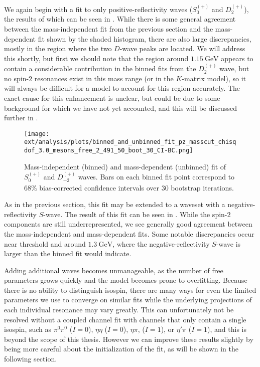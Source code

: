We again begin with a fit to only positive-reflectivity waves ($S_0^{(+)}$ and $D_2^{(+)}$), the results of which can be seen in . While there is some general agreement between the mass-independent fit from the previous section and the mass-dependent fit shown by the shaded histogram, there are also large discrepancies, mostly in the region where the two $D$-wave peaks are located. We will address this shortly, but first we should note that the region around $\SI{1.15}{\giga\electronvolt}$ appears to contain a considerable contribution in the binned fits from the $D_2^{(+)}$ wave, but no spin-$2$ resonances exist in this mass range (or in the $K$-matrix model), so it will always be difficult for a model to account for this region accurately. The exact cause for this enhancement is unclear, but could be due to some background for which we have not yet accounted, and this will be discussed further in .

\begin{figure}
  \begin{center}
    \texttt{[image: ext/analysis/plots/binned\_and\_unbinned\_fit\_pz\_masscut\_chisqdof\_3.0\_mesons\_free\_2\_491\_50\_boot\_30\_CI-BC.png]}
  \end{center}
  \caption{Mass-independent (binned) and mass-dependent (unbinned) fit of $S_{0}^{(+)}$ and $D_{+2}^{(+)}$ waves. Bars on each binned fit point correspond to $68\%$ bias-corrected confidence intervals over $ 30 $ bootstrap iterations.}\label{fig:unbinned-fit-chisqdof-3.0-Sp-D2p}
\end{figure}

As in the previous section, this fit may be extended to a waveset with a negative-reflectivity $S$-wave. The result of this fit can be seen in . While the spin-$2$ components are still underrepresented, we see generally good agreement between the mass-independent and mass-dependent fits. Some notable discrepancies occur near threshold and around $\SI{1.3}{\giga\electronvolt}$, where the negative-reflectivity $S$-wave is larger than the binned fit would indicate.

Adding additional waves becomes unmanageable, as the number of free parameters grows quickly and the model becomes prone to overfitting. Because there is no ability to distinguish isospin, there are many ways for even the limited parameters we use to converge on similar fits while the underlying projections of each individual resonance may vary greatly. This can unfortunately not be resolved without a coupled channel fit with channels that only contain a single isospin, such as $\pi^0\pi^0$ ($I=0$), $\eta\eta$ ($I=0$), $\eta\pi$, ($I=1$), or $\eta'\pi$ ($I=1$), and this is beyond the scope of this thesis. However we can improve these results slightly by being more careful about the initialization of the fit, as will be shown in the following section.

